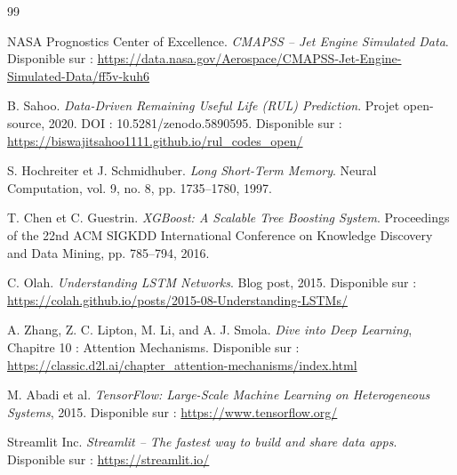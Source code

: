 \documentclass[12pt,a4paper]{report}
\theoremstyle{definition}
\begin{document}
\begin{thebibliography}{99}

NASA Prognostics Center of Excellence.
\textit{CMAPSS -- Jet Engine Simulated Data}.
Disponible sur : \url{https://data.nasa.gov/Aerospace/CMAPSS-Jet-Engine-Simulated-Data/ff5v-kuh6}

B. Sahoo.
\textit{Data-Driven Remaining Useful Life (RUL) Prediction}.
Projet open-source, 2020. DOI : 10.5281/zenodo.5890595.
Disponible sur : \url{https://biswajitsahoo1111.github.io/rul_codes_open/}

S. Hochreiter et J. Schmidhuber.
\textit{Long Short-Term Memory}.
Neural Computation, vol. 9, no. 8, pp. 1735--1780, 1997.

T. Chen et C. Guestrin.
\textit{XGBoost: A Scalable Tree Boosting System}.
Proceedings of the 22nd ACM SIGKDD International Conference on Knowledge Discovery and Data Mining, pp. 785--794, 2016.

C. Olah.
\textit{Understanding LSTM Networks}.
Blog post, 2015.
Disponible sur : \url{https://colah.github.io/posts/2015-08-Understanding-LSTMs/}

A. Zhang, Z. C. Lipton, M. Li, and A. J. Smola.
\textit{Dive into Deep Learning}, Chapitre 10 : Attention Mechanisms.
Disponible sur : \url{https://classic.d2l.ai/chapter_attention-mechanisms/index.html}

M. Abadi et al.
\textit{TensorFlow: Large-Scale Machine Learning on Heterogeneous Systems}, 2015.
Disponible sur : \url{https://www.tensorflow.org/}

Streamlit Inc.
\textit{Streamlit -- The fastest way to build and share data apps}.
Disponible sur : \url{https://streamlit.io/}

\end{thebibliography}
\end{document}
